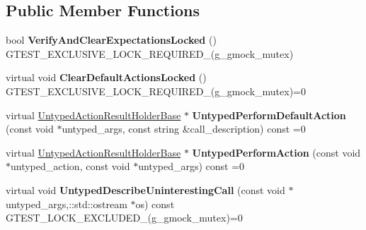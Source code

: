 \subsection*{Public Member Functions}
\begin{DoxyCompactItemize}
\item 
bool {\bfseries Verify\+And\+Clear\+Expectations\+Locked} () G\+T\+E\+S\+T\+\_\+\+E\+X\+C\+L\+U\+S\+I\+V\+E\+\_\+\+L\+O\+C\+K\+\_\+\+R\+E\+Q\+U\+I\+R\+E\+D\+\_\+(g\+\_\+gmock\+\_\+mutex)\hypertarget{classtesting_1_1internal_1_1UntypedFunctionMockerBase_a3f1d62a1662a3daa2895b3af963be269}{}\label{classtesting_1_1internal_1_1UntypedFunctionMockerBase_a3f1d62a1662a3daa2895b3af963be269}

\item 
virtual void {\bfseries Clear\+Default\+Actions\+Locked} () G\+T\+E\+S\+T\+\_\+\+E\+X\+C\+L\+U\+S\+I\+V\+E\+\_\+\+L\+O\+C\+K\+\_\+\+R\+E\+Q\+U\+I\+R\+E\+D\+\_\+(g\+\_\+gmock\+\_\+mutex)=0\hypertarget{classtesting_1_1internal_1_1UntypedFunctionMockerBase_a40ddd95736946a7951033aa89a7b617f}{}\label{classtesting_1_1internal_1_1UntypedFunctionMockerBase_a40ddd95736946a7951033aa89a7b617f}

\item 
virtual \hyperlink{classtesting_1_1internal_1_1UntypedActionResultHolderBase}{Untyped\+Action\+Result\+Holder\+Base} $\ast$ {\bfseries Untyped\+Perform\+Default\+Action} (const void $\ast$untyped\+\_\+args, const string \&call\+\_\+description) const =0\hypertarget{classtesting_1_1internal_1_1UntypedFunctionMockerBase_a2cb149456cd559d5b0615f2310b235e3}{}\label{classtesting_1_1internal_1_1UntypedFunctionMockerBase_a2cb149456cd559d5b0615f2310b235e3}

\item 
virtual \hyperlink{classtesting_1_1internal_1_1UntypedActionResultHolderBase}{Untyped\+Action\+Result\+Holder\+Base} $\ast$ {\bfseries Untyped\+Perform\+Action} (const void $\ast$untyped\+\_\+action, const void $\ast$untyped\+\_\+args) const =0\hypertarget{classtesting_1_1internal_1_1UntypedFunctionMockerBase_ada5a72303863d0aa655b66338b8efea5}{}\label{classtesting_1_1internal_1_1UntypedFunctionMockerBase_ada5a72303863d0aa655b66338b8efea5}

\item 
virtual void {\bfseries Untyped\+Describe\+Uninteresting\+Call} (const void $\ast$untyped\+\_\+args,\+::std\+::ostream $\ast$os) const G\+T\+E\+S\+T\+\_\+\+L\+O\+C\+K\+\_\+\+E\+X\+C\+L\+U\+D\+E\+D\+\_\+(g\+\_\+gmock\+\_\+mutex)=0\hypertarget{classtesting_1_1internal_1_1UntypedFunctionMockerBase_aeb80e61406142e87f94fab10873e20ce}{}\label{classtesting_1_1internal_1_1UntypedFunctionMockerBase_aeb80e61406142e87f94fab10873e20ce}


\end{DoxyCompactItemize}
